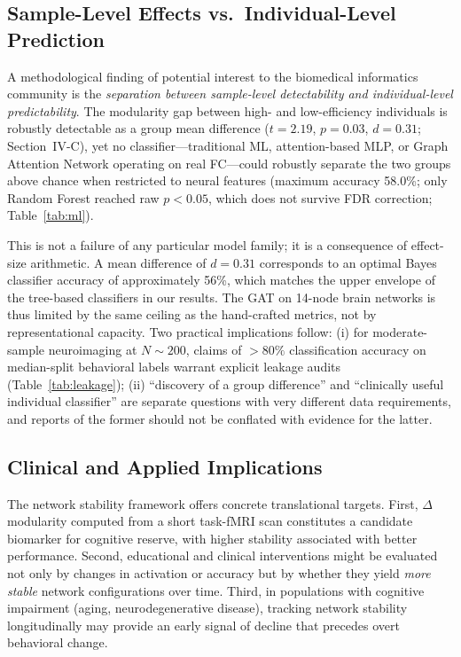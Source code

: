 \documentclass[conference]{IEEEtran}
\begin{document}
\subsection{Sample-Level Effects vs.\ Individual-Level Prediction}

A methodological finding of potential interest to the biomedical informatics community is the \emph{separation between sample-level detectability and individual-level predictability}. The modularity gap between high- and low-efficiency individuals is robustly detectable as a group mean difference ($t=2.19$, $p=0.03$, $d=0.31$; Section~IV-C), yet no classifier---traditional ML, attention-based MLP, or Graph Attention Network operating on real FC---could robustly separate the two groups above chance when restricted to neural features (maximum accuracy 58.0\%; only Random Forest reached raw $p<0.05$, which does not survive FDR correction; Table~\ref{tab:ml}).

This is not a failure of any particular model family; it is a consequence of effect-size arithmetic. A mean difference of $d=0.31$ corresponds to an optimal Bayes classifier accuracy of approximately 56\%, which matches the upper envelope of the tree-based classifiers in our results. The GAT on 14-node brain networks is thus limited by the same ceiling as the hand-crafted metrics, not by representational capacity. Two practical implications follow: (i) for moderate-sample neuroimaging at $N\sim 200$, claims of $>80\%$ classification accuracy on median-split behavioral labels warrant explicit leakage audits (Table~\ref{tab:leakage}); (ii) ``discovery of a group difference'' and ``clinically useful individual classifier'' are separate questions with very different data requirements, and reports of the former should not be conflated with evidence for the latter.

\subsection{Clinical and Applied Implications}

The network stability framework offers concrete translational targets. First, $\Delta$ modularity computed from a short task-fMRI scan constitutes a candidate biomarker for cognitive reserve, with higher stability associated with better performance. Second, educational and clinical interventions might be evaluated not only by changes in activation or accuracy but by whether they yield \emph{more stable} network configurations over time. Third, in populations with cognitive impairment (aging, neurodegenerative disease), tracking network stability longitudinally may provide an early signal of decline that precedes overt behavioral change.
\end{document}
